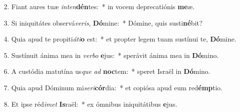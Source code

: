 2. Fiant aures tuæ \textit{in}\textit{ten}\textbf{dén}tes:~*  in vocem deprecatiónis \textbf{me}æ.\

3. Si iniquitátes observá\textit{ve}\textit{ris}, \textbf{Dó}mine:~*  Dómine, quis susti\textbf{né}bit?\

4. Quia apud te propiti\textit{á}\textit{ti}\textbf{o} est:~*  et propter legem tuam sustínui te, \textbf{Dó}mine.\

5. Sustínuit ánima mea in \textit{ver}\textit{bo} \textbf{e}jus:~*  sperávit ánima mea in \textbf{Dó}mino.\

6. A custódia matutína us\textit{que} \textit{ad} \textbf{noc}tem:~*  speret Israël in \textbf{Dó}mino.\

7. Quia apud Dóminum mi\textit{se}\textit{ri}\textbf{cór}dia:~*  et copiósa apud eum red\textbf{émp}tio.\

8. Et ipse réd\textit{i}\textit{met} \textbf{Is}raël:~*  ex ómnibus iniquitátibus \textbf{e}jus.\

